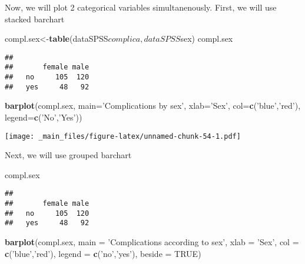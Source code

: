 \documentclass[]{book}
\newenvironment{Shaded}{\begin{snugshade}}{\end{snugshade}}
\newcommand{\KeywordTok}[1]{\textcolor[rgb]{0.13,0.29,0.53}{\textbf{{#1}}}}
\newcommand{\DataTypeTok}[1]{\textcolor[rgb]{0.13,0.29,0.53}{{#1}}}
\newcommand{\StringTok}[1]{\textcolor[rgb]{0.31,0.60,0.02}{{#1}}}
\newcommand{\OtherTok}[1]{\textcolor[rgb]{0.56,0.35,0.01}{{#1}}}
\newcommand{\NormalTok}[1]{{#1}}
\theoremstyle{definition}
\theoremstyle{definition}
\theoremstyle{remark}
\begin{document}
Now, we will plot 2 categorical variables simultanenously. First, we
will use stacked barchart

\begin{Shaded}
\begin{Highlighting}[]
\NormalTok{compl.sex<-}\KeywordTok{table}\NormalTok{(dataSPSS$complica,dataSPSS$sex)}
\NormalTok{compl.sex}
\end{Highlighting}
\end{Shaded}

\begin{verbatim}
##      
##       female male
##   no     105  120
##   yes     48   92
\end{verbatim}

\begin{Shaded}
\begin{Highlighting}[]
\KeywordTok{barplot}\NormalTok{(compl.sex,}
        \DataTypeTok{main=}\StringTok{'Complications by sex'}\NormalTok{,}
        \DataTypeTok{xlab=}\StringTok{'Sex'}\NormalTok{,}
        \DataTypeTok{col=}\KeywordTok{c}\NormalTok{(}\StringTok{'blue'}\NormalTok{,}\StringTok{'red'}\NormalTok{),}
        \DataTypeTok{legend=}\KeywordTok{c}\NormalTok{(}\StringTok{'No'}\NormalTok{,}\StringTok{'Yes'}\NormalTok{))}
\end{Highlighting}
\end{Shaded}

\texttt{[image: \_main\_files/figure-latex/unnamed-chunk-54-1.pdf]}

Next, we will use grouped barchart

\begin{Shaded}
\begin{Highlighting}[]
\NormalTok{compl.sex}
\end{Highlighting}
\end{Shaded}

\begin{verbatim}
##      
##       female male
##   no     105  120
##   yes     48   92
\end{verbatim}

\begin{Shaded}
\begin{Highlighting}[]
\KeywordTok{barplot}\NormalTok{(compl.sex,}
        \DataTypeTok{main =} \StringTok{'Complications according to sex'}\NormalTok{,}
        \DataTypeTok{xlab =} \StringTok{'Sex'}\NormalTok{,}
        \DataTypeTok{col =} \KeywordTok{c}\NormalTok{(}\StringTok{'blue'}\NormalTok{,}\StringTok{'red'}\NormalTok{),}
        \DataTypeTok{legend =} \KeywordTok{c}\NormalTok{(}\StringTok{'no'}\NormalTok{,}\StringTok{'yes'}\NormalTok{),}
        \DataTypeTok{beside =} \OtherTok{TRUE}\NormalTok{)}
\end{Highlighting}
\end{Shaded}
\end{document}
